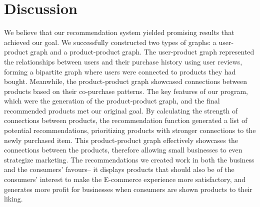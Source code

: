 \documentclass[fontsize=11pt]{article}
\begin{document}
\section*{Discussion}
We believe that our recommendation system yielded promising results that achieved our goal. We successfully constructed two types of graphs: a user-product graph and a product-product graph. The user-product graph represented the relationships between users and their purchase history using user reviews, forming a bipartite graph where users were connected to products they had bought. Meanwhile, the product-product graph showcased connections between products based on their co-purchase patterns. The key features of our program, which were the generation of the product-product graph, and the final recommended products met our original goal. By calculating the strength of connections between products, the recommendation function generated a list of potential recommendations, prioritizing products with stronger connections to the newly purchased item. This product-product graph effectively showcases the connections between the products, therefore allowing small businesses to even strategize marketing. The recommendations we created work in both the business and the consumers' favours-- it displays products that should also be of the consumers' interest to make the E-commerce experience more satisfactory, and generates more profit for businesses when consumers are shown products to their liking. \\
\end{document}
